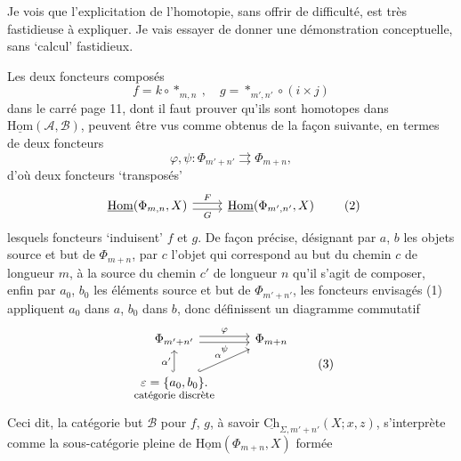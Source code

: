 \documentclass[11pt]{article}
\newcommand{\printedpage}[1]{\marginpar{\footnotesize p.~#1}}
\newcommand{\msp}[1]{\marginpar{\footnotesize [#1]}}
\newcommand{\Ch}{\underline{\mathrm{Ch}}}
\newcommand{\uHom}{\underline{\mathrm{Hom}}}
\begin{document}
Je vois que l'explicitation de l'homotopie, sans offrir de difficulté, est très fastidieuse à expliquer. Je vais essayer de donner une démonstration conceptuelle, sans `calcul' fastidieux.


\printedpage{10}

\msp{page 15}
Les deux foncteurs composés
\[
f=k\circ *_{m,n}\ ,\quad g=*_{m',n'}\circ(i\times j)
\]
dans le carré page 11, dont il faut prouver qu'ils sont homotopes dans $\uHom(\mathcal{A},\mathcal{B})$, peuvent être vus comme obtenus de la façon suivante, en termes de deux foncteurs
\[
\varphi,\psi:\Phi_{m'+n'}\rightrightarrows\Phi_{m+n}, \tag*{(1)}
\]
d'où deux foncteurs `transposés'
\[
\begin{tikzcd}
\uHom(\Phi_{m,n},X) \arrow[r,shift left,"F"] \arrow[r,shift right,"G"'] & \uHom(\Phi_{m',n'},X)
\end{tikzcd} \tag*{(2)}
\]
 lesquels foncteurs `induisent' $f$ et $g$. De façon précise, désignant par $a$, $b$ les objets source et but de $\Phi_{m+n}$, par $c$ l'objet qui correspond au but du chemin $c$ de longueur $m$, à la source du chemin $c'$ de longueur $n$ qu'il s'agit de composer, enfin par $a_0$, $b_0$ les éléments source et but de $\Phi_{m'+n'}$, les foncteurs envisagés (1) appliquent $a_0$ dans $a$, $b_0$ dans $b$, donc définissent un diagramme commutatif
\[
\begin{tikzcd}
\Phi_{m'+n'} \arrow[r,shift left,"\varphi"] \arrow[r,shift right,"\psi"'] & \Phi_{m+n} \\
\underset{\text{\footnotesize catégorie discrète}}{\varepsilon=\{a_0,b_0\}.} \arrow[u,hook,"\alpha'"] \arrow[ur,hook,"\alpha"] &
\end{tikzcd} \tag*{(3)}
\]
Ceci dit, la catégorie but $\mathcal{B}$ pour $f$, $g$, à savoir $\Ch_{\Sigma,m'+n'}(X;x,z)$, s'interprète comme la sous-catégorie pleine de $\uHom(\Phi_{m+n},X)$ formée
\end{document}
